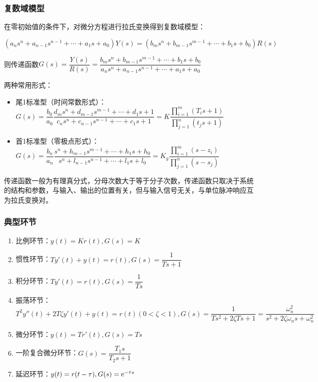 \documentclass[11pt,a4paper]{ctexart}
\begin{document}
        \subsubsection{复数域模型}
        在零初始值的条件下，对微分方程进行拉氏变换得到复数域模型：

        \[
        (a_ns^{n}+a_{n-1}s^{n-1}+\cdots+a_1s+a_0)Y(s)=(b_ms^{n}+b_{m-1}s^{m-1}+\cdots+b_1s+b_0)R(s)
        \]
        
        则传递函数$G(s)=\dfrac{Y(s)}{R(s)}=\dfrac{b_ms^{n}+b_{m-1}s^{m-1}+\cdots+b_1s+b_0}{a_ns^{n}+a_{n-1}s^{n-1}+\cdots+a_1s+a_0}$

        两种常用形式：
        \begin{itemize}
            \item 尾1标准型（时间常数形式）：
            $G(s)=\dfrac{b_0}{a_0}\dfrac{d_ms^{n}+d_{m-1}s^{m-1}+\cdots+d_1s+1}{c_ns^{n}+c_{n-1}s^{n-1}+\cdots+c_1s+1}=K\dfrac{\prod\limits_{i=1}^m(T_is+1)}{\prod\limits_{j=1}^n(t_js+1)}$
            \item 首1标准型（零极点形式）：
            $G(s)=\dfrac{b_n}{a_n}\dfrac{s^{n}+h_{m-1}s^{m-1}+\cdots+h_1s+h_0}{s^{n}+l_{n-1}s^{n-1}+\cdots+l_1s+l_0}=K_g\dfrac{\prod\limits_{i=1}^m(s-z_i)}{\prod\limits_{j=1}^n(s-s_j)}$
        \end{itemize}

        传递函数一般为有理真分式，分母次数大于等于分子次数，传递函数只取决于系统的结构和参数，与输入、输出的位置有关，但与输入信号无关，与单位脉冲响应互为拉氏变换对。
        \subsubsection{典型环节}
            \begin{enumerate}
                \item 比例环节：$y(t)=Kr(t),G(s)=K$
                \item 惯性环节：$Ty'(t)+y(t)=r(t),G(s)=\dfrac{1}{Ts+1}$
                \item 积分环节：$Ty'(t)=r(t),G(s)=\dfrac{1}{Ts}$
                \item 振荡环节：$T^2y''(t)+2T\zeta y'(t)+y(t)=r(t)(0<\zeta<1),G(s)=\dfrac{1}{Ts^2+2\zeta Ts+1}=\dfrac{\omega_n^2}{s^2+2\zeta\omega_ns+\omega_n^2}$
                \item 微分环节：$y(t)=Tr'(t),G(s)=Ts$
                \item 一阶复合微分环节：$G(s)=\dfrac{T_1s}{T_2s+1}$
                \item 延迟环节：$y(t)=r(t-\tau),G(s)={\rm e}^{-\tau s}$
            \end{enumerate}      
\end{document}
